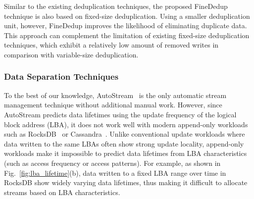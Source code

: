 Similar to the existing deduplication techniques,
the proposed FineDedup technique is also based on fixed-size deduplication.
Using a smaller deduplication unit,
however, FineDedup improves the likelihood of eliminating duplicate data.
This approach can complement the limitation of existing fixed-size deduplication techniques,
which exhibit a relatively low amount of removed writes 
in comparison with variable-size deduplication.


\subsubsection{Data Separation Techniques}

To the best of our knowledge, \textsf{\small AutoStream}~\cite{AutoStream} is the only automatic 
stream management technique
without additional manual work.  
However, since \textsf{\small AutoStream} predicts data lifetimes using the update frequency 
of the logical block address (LBA), it does not work well with modern append-only workloads 
such as RocksDB~\cite{RocksDB} or Cassandra~\cite{Cassandra}.  
Unlike conventional update workloads where data written to the same LBAs 
often show strong update locality, 
append-only workloads make it impossible to predict data lifetimes 
from LBA characteristics (such as access frequency or access patterns).  
For example, as shown in Fig.~\ref{fig:lba_lifetime}(b), 
data written to a fixed LBA range over time in RocksDB 
show widely varying data lifetimes, 
thus making it difficult to allocate streams based on LBA characteristics.



